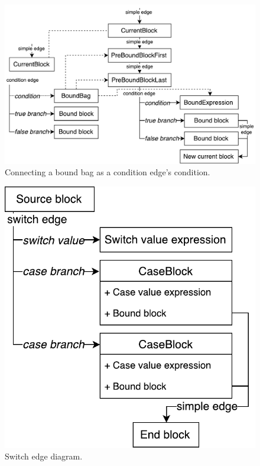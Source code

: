 \begin{figure}[h]
	\centering	
	\includegraphics[scale=0.70]{../img/5_3_newInIfEdge}	
	\caption{Connecting a bound bag as a condition edge's condition.}
	\label{fig5.3:BindIfEdge}
\end{figure}

\begin{figure}[h]
	\centering	
	\includegraphics[scale=0.75]{../img/5_3_switchEdge}	
	\caption{Switch edge diagram.}
	\label{fig5.3:SwitchEdge}
\end{figure}


